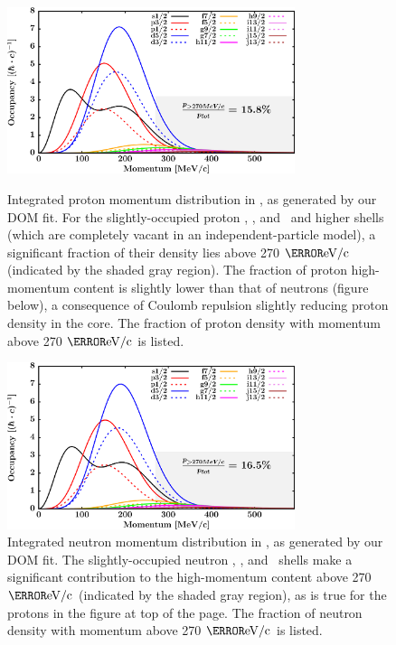 \begin{figure}[tb]
    \centering
    \includegraphics[width=0.75\textwidth]{figures/ca40_protonLJMomentumDistIntegral.png}
    \caption[Proton momentum distribution in \caForty]
    {
        Integrated proton momentum distribution in \caForty, as generated
        by our DOM fit. For the slightly-occupied proton \fSeven, \fFive, and
        \gNine\ and higher shells (which are completely vacant in an
        independent-particle model), a significant fraction of their
        density lies above 270 $\mega\electronvolt/\text{c}$ (indicated by
        the shaded gray region). The fraction of
        proton high-momentum content is slightly lower than that of neutrons
        (figure below), a consequence of Coulomb repulsion slightly reducing
        proton density in the core. The fraction of proton density with
        momentum above 270 $\mega\electronvolt/\text{c}$ is listed.
    }
    \label{Ca40ProtonMomentumDistInt}
    \vspace{16pt}
    \centering
    \includegraphics[width=0.75\textwidth]{figures/ca40_neutronLJMomentumDistIntegral.png}
    \caption[Neutron momentum distributions in \caForty]
    {
        Integrated neutron momentum distribution in \caForty, as generated
        by our DOM fit. The slightly-occupied neutron \fSeven, \fFive, and
        \gNine\ shells make a significant contribution to the high-momentum
        content above 270 $\mega\electronvolt/\text{c}$ (indicated by the
        shaded gray region), as is true for the protons in the figure at top
        of the page. The fraction of neutron density with
        momentum above 270 $\mega\electronvolt/\text{c}$ is listed.
    }
    \label{Ca40NeutronMomentumDistInt}
\end{figure}

